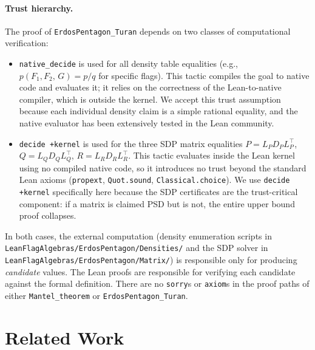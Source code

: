 \documentclass{article}
\newcommand{\den}[2]{p(#1,\,#2)}
\newcommand{\lean}[1]{\texttt{#1}}
\begin{document}
\paragraph{Trust hierarchy.}
The proof of \lean{ErdosPentagon\_Turan} depends on two classes of
computational verification:
\begin{itemize}
  \item \lean{native\_decide} is used for all density table equalities
    (e.g., $\den{F_1,F_2}{G} = p/q$ for specific flags).  This tactic
    compiles the goal to native code and evaluates it; it relies on the
    correctness of the Lean-to-native compiler, which is outside the kernel.
    We accept this trust assumption because each individual density claim is
    a simple rational equality, and the native evaluator has been extensively
    tested in the Lean community.

  \item \lean{decide +kernel} is used for the three SDP matrix equalities
    $P = L_P D_P L_P^\top$, $Q = L_Q D_Q L_Q^\top$, $R = L_R D_R L_R^\top$.
    This tactic evaluates inside the Lean kernel using no compiled native
    code, so it introduces no trust beyond the standard Lean axioms
    (\lean{propext}, \lean{Quot.sound}, \lean{Classical.choice}).
    We use \lean{decide +kernel} specifically here because the SDP
    certificates are the trust-critical component: if a matrix is claimed PSD
    but is not, the entire upper bound proof collapses.
\end{itemize}
In both cases, the external computation (density enumeration scripts
in \lean{LeanFlagAlgebras/ErdosPentagon/Densities/} and the SDP solver in
\lean{LeanFlagAlgebras/ErdosPentagon/Matrix/}) is responsible only for
producing \emph{candidate} values.  The Lean proofs are responsible for
verifying each candidate against the formal definition.  There are no
\lean{sorry}s or \lean{axiom}s in the proof paths of either
\lean{Mantel\_theorem} or \lean{ErdosPentagon\_Turan}.


\section{Related Work}
\label{sec:related}
\end{document}
